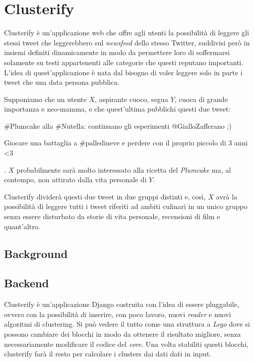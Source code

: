 \chapter{Clusterify}
	Clusterify è un'applicazione web che offre agli utenti la possibilità di leggere gli stessi tweet che leggerebbero sul \emph{newsfeed} dello stesso Twitter, suddivisi però in insiemi definiti dinamicamente in modo da permettere loro di soffermarsi solamente su testi appartenenti alle categorie che questi reputano importanti. L'idea di quest'applicazione è nata dal bisogno di voler leggere solo in parte i tweet che una data persona pubblica. 

	Supponiamo che un utente $X$, aspirante cuoco, segua $Y$, cuoca di grande importanza e neo-mamma, e che quest'ultima pubblichi questi due tweet:
	\begin{inparaenum}
		\item \#Plumcake alla \#Nutella: continuano gli esperimenti @GialloZafferano ;)
		\item Giocare una battaglia a \#palledineve e perdere con il proprio piccolo di 3 anni <3
	\end{inparaenum}.
	$X$ probabilmente sarà molto interessato alla ricetta del \emph{Plumcake} ma, al contempo, non attirato dalla vita personale di $Y$.

	Clusterify dividerà questi due tweet in due gruppi distinti e, così, $X$ avrà la possibilità di leggere tutti i tweet riferiti ad ambiti culinari in un unico gruppo senza essere disturbato da storie di vita personale, recensioni di film e quant'altro.

\section{Background}
	
	

\section{Backend}
	Clusterify è un'applicazione Django\cite{django_project} costruita con l'idea di essere pluggabile, ovvero con la possibilità di inserire, con poco lavoro, nuovi \emph{reader} e nuovi algoritmi di clustering. Si può vedere il tutto come una struttura a \emph{Lego} dove si possono cambiare dei blocchi in modo da ottenere il risultato migliore, senza necessariamente modificare il codice del \emph{core}. Una volta stabiliti questi blocchi, clusterify farà il resto per calcolare i clusters dai dati dati in input.


